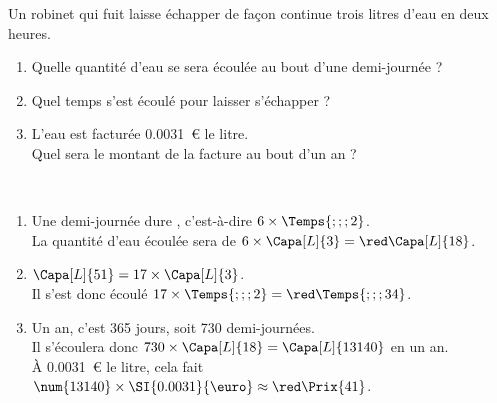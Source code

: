 \begin{exercice*} %
   Un robinet qui fuit laisse échapper de façon continue trois litres d’eau en deux heures.
   \begin{enumerate}
      \item Quelle quantité d’eau se sera écoulée au bout d’une demi-journée ?
      \item Quel temps s’est écoulé pour laisser s’échapper  ?
      \item L’eau est facturée \SI{0.0031}{\euro} le litre. \\
         Quel sera le montant de la facture au bout d’un an ?
   \end{enumerate}
\end{exercice*}

\begin{corrige}
   \ \\ [-5mm]
   \begin{enumerate}
      \item Une demi-journée dure , c'est-à-dire $6\times\Temps{;;;2}$. \\
         La quantité d'eau écoulée sera de $6\times\Capa[L]{3} =\red \Capa[L]{18}$.
      \item $\Capa[L]{51} =17\times\Capa[L]{3}$. \\
         Il s'est donc écoulé $17\times\Temps{;;;2} =\red \Temps{;;;34}$.
      \item Un an, c'est 365 jours, soit 730 demi-journées. \\
         Il s'écoulera donc $730\times\Capa[L]{18} =\Capa[L]{13140}$ en un an. \\
         À \SI{0.0031}{\euro} le litre, cela fait $\num{13140}\times\SI{0.0031}{\euro} \approx\red \Prix{41}$.
   \end{enumerate}
\end{corrige}
